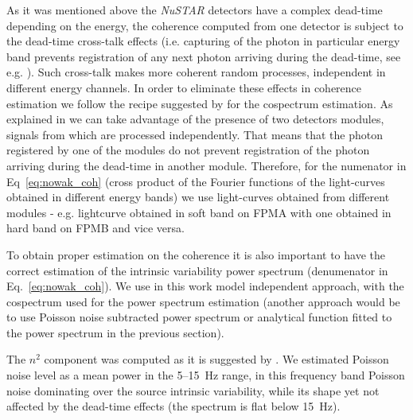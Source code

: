 \documentclass[a4paper,fleqn,usenatbib]{mnras}
\begin{document}
As it was mentioned above the {\it NuSTAR} detectors have a complex dead-time depending on the energy, the coherence computed from one detector is subject to the dead-time cross-talk effects (i.e. capturing of the photon in particular energy band prevents registration of any next photon arriving during the dead-time, see e.g. \citet{2015MNRAS.451.4253R}). 
Such cross-talk makes more coherent random processes, independent in different energy channels.
In order to eliminate these effects in coherence estimation we follow the recipe suggested by \citet{2015ApJ...800..109B} for the cospectrum estimation. 
As explained in \citet{2015ApJ...800..109B} we can take advantage of the presence of two detectors modules, signals from which are processed independently. 
That means that the photon registered by one of the modules do not prevent registration of the photon arriving during the dead-time in another module. 
Therefore, for the numenator in Eq~\ref{eq:nowak_coh} (cross product of the Fourier functions of the light-curves obtained in different energy bands) we use light-curves obtained from different modules - e.g. lightcurve obtained in soft band on FPMA with one obtained in hard band on FPMB and vice versa.

To obtain proper estimation on the coherence it is also important to have the correct estimation of the intrinsic variability power spectrum (denumenator in Eq.~\ref{eq:nowak_coh}).
We use in this work model independent approach, with the cospectrum used for the power spectrum estimation (another approach would be to use Poisson noise subtracted power spectrum or analytical function fitted to the power spectrum in the previous section).

The $n^2$ component was computed as it is suggested by . 
We estimated Poisson noise level as a mean power in the 5--15~Hz range, in this frequency band Poisson noise dominating over the source intrinsic variability, while its shape yet not affected by the dead-time effects (the spectrum is flat below 15~Hz).
\end{document}

